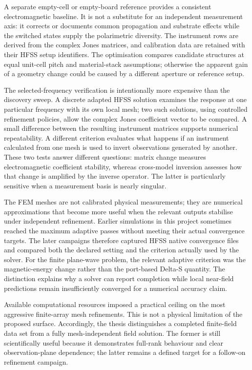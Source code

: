 \documentclass{ieeeaccess}
\begin{document}
A separate empty-cell or empty-board reference provides a consistent electromagnetic baseline. It is not a substitute for an independent measurement axis: it corrects or documents common propagation and substrate effects while the switched states supply the polarimetric diversity. The instrument rows are derived from the complex Jones matrices, and calibration data are retained with their HFSS setup identifiers. The optimisation compares candidate structures at equal unit-cell pitch and material-stack assumptions; otherwise the apparent gain of a geometry change could be caused by a different aperture or reference setup.

The selected-frequency verification is intentionally more expensive than the discovery sweep. A discrete adapted HFSS solution examines the response at one particular frequency with its own local mesh; two such solutions, using controlled refinement policies, allow the complex Jones coefficient vector to be compared. A small difference between the resulting instrument matrices supports numerical repeatability. A different criterion evaluates what happens if an instrument calculated from one mesh is used to invert observations generated by another. These two tests answer different questions: matrix change measures electromagnetic coefficient stability, whereas cross-model inversion assesses how that change is amplified by the inverse operator. The latter is particularly sensitive when a measurement basis is nearly singular.

The FEM meshes are not calibrated physical measurements; they are numerical approximations that become more useful when the relevant outputs stabilise under independent refinement. Earlier simulations in this project sometimes reached the maximum adaptive passes without meeting their actual convergence targets. The later campaigns therefore captured HFSS native convergence files and compared both the declared setting and the criterion actually used by the solver. For the finite plane-wave problem, the relevant adaptive criterion was the magnetic-energy change rather than the port-based Delta-S quantity. The distinction explains why a solver can report completion while local near-field predictions remain insufficiently converged for a numerical accuracy claim.

Available computational resources imposed a practical ceiling on the most aggressive finite-array mesh refinements. This is not a physical limitation of the proposed surface. Accordingly, the thesis distinguishes a completed finite-field data set from a fully mesh-independent field solution. The former is still scientifically useful because it demonstrates full-rank behaviour and clear observation-plane dependence; the latter remains a defined target for a follow-on refinement campaign.
\end{document}
